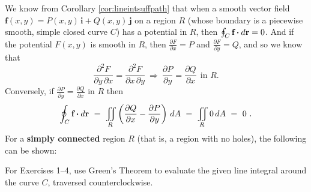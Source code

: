 We know from Corollary \ref{cor:lineintsuffpath} that when a smooth vector field
$\mathbf{f}(x,y) = P(x,y)\,\mathbf{i} + Q(x,y)\,\mathbf{j}$ on a region $R$ (whose boundary is a piecewise smooth,
simple closed curve $C$) has a potential in $R$, then $\oint_{C} \textbf{f} \bm{\cdot} d\textbf{r} = 0$. And if the potential
$F(x,y)$ is smooth in $R$, then
$\frac{\partial F}{\partial x} = P$ and $\frac{\partial F}{\partial y} = Q$, and so we know that
\begin{displaymath}
 \frac{\partial^2 F}{\partial y \,\partial x} = \frac{\partial^2 F}{\partial x \,\partial y} ~\Rightarrow~
 \frac{\partial P}{\partial y} = \frac{\partial Q}{\partial x} ~~\text{in $R$.}
\end{displaymath}
Conversely, if $\frac{\partial P}{\partial y} = \frac{\partial Q}{\partial x}$ in $R$ then
\begin{displaymath}
 \oint_{C} \textbf{f} \bm{\cdot} d\textbf{r} ~=~ \iint\limits_{R} \left( \frac{\partial Q}{\partial x} -
   \frac{\partial P}{\partial y} \right)\,dA ~=~ \iint\limits_{R} 0\,dA ~=~ 0 ~.
\end{displaymath}
For a \textbf{simply connected} region $R$ (that is, a region with no holes), the following can be
shown:\medskip
{}
\centerline{}
\label{sec4dot3}
\par\noindent For Exercises 1--4, use Green's Theorem to evaluate the given line integral around the curve $C$, traversed
counterclockwise.
